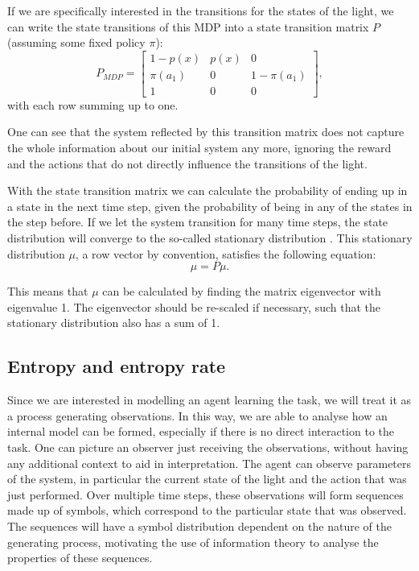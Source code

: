 \documentclass[12pt,a4paper]{article}
\begin{document}
If we are specifically interested in the transitions for the states of the light, we can write the state transitions of this MDP into a state transition matrix $P$ (assuming some fixed policy $\pi$):
\begin{equation}
    \label{eq:P_mdp}
    P_{MDP} =
    \begin{bmatrix} 1 - p(x) & p(x) & 0            \\
                \pi(a_1) & 0    & 1 - \pi(a_1) \\
                1        & 0    & 0
    \end{bmatrix},
\end{equation}
with each row summing up to one.

One can see that the system reflected by this transition matrix does not capture the whole information about our initial system any more, ignoring the reward and the actions that do not directly influence the transitions of the light.

With the state transition matrix we can calculate the probability of ending up in a state in the next time step, given the probability of being in any of the states in the step before.
If we let the system transition for many time steps, the state distribution will converge to the so-called stationary distribution \autocite{cover1999elements}.
This stationary distribution $\mu$, a row vector by convention, satisfies the following equation:
\begin{equation}
    \label{eq:stationary_dist}
    \mu = P \mu.
\end{equation}

This means that $\mu$ can be calculated by finding the matrix eigenvector with eigenvalue 1.
The eigenvector should be re-scaled if necessary, such that the stationary distribution also has a sum of 1.

\subsection{Entropy and entropy rate} \label{ssec:entropy_rate}
Since we are interested in modelling an agent learning the task, we will treat it as a process generating observations.
In this way, we are able to analyse how an internal model can be formed, especially if there is no direct interaction to the task.
One can picture an observer just receiving the observations, without having any additional context to aid in interpretation.
The agent can observe parameters of the system, in particular the current state of the light and the action that was just performed.
Over multiple time steps, these observations will form sequences made up of symbols, which correspond to the particular state that was observed.
The sequences will have a symbol distribution dependent on the nature of the generating process, motivating the use of information theory to analyse the properties of these sequences.
\end{document}
